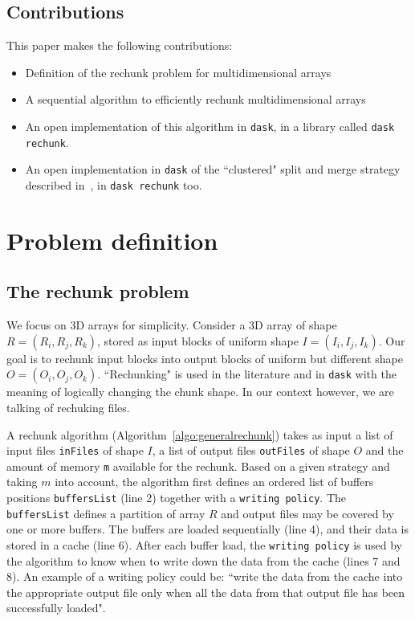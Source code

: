 \documentclass[conference]{IEEEtran}
\begin{document}
\subsection{Contributions}
This paper makes the following contributions:
\begin{itemize}
  \item Definition of the rechunk problem for multidimensional arrays
  \item A sequential algorithm to efficiently rechunk multidimensional arrays
  \item An open implementation of this algorithm in \texttt{dask},
  in a library called \texttt{dask rechunk}.
  \item An open implementation in \texttt{dask} of the ``clustered" split and
  merge strategy described in~\cite{seqalgorithms}, in \texttt{dask rechunk} too.
\end{itemize}

\section{Problem definition}
\subsection{The rechunk problem}
We focus on 3D arrays for simplicity. Consider a 3D array of shape $R =
(R_i, R_j, R_k)$, stored as input blocks of uniform shape $I =
(I_i, I_j, I_k)$. Our goal is to rechunk input blocks into output blocks of
uniform but different shape $O = (O_i, O_j, O_k)$. ``Rechunking" is used in
the literature and in \texttt{dask} with the meaning of logically changing the
chunk shape. In our context however, we are talking of rechuking files.

A rechunk algorithm (Algorithm~\ref{algo:generalrechunk}) takes as input a
list of input files \texttt{inFiles} of shape $I$, a list of output files
\texttt{outFiles} of shape $O$ and the amount of memory \texttt{m}
available for the rechunk. Based on a given strategy and taking $m$ into
account, the algorithm first defines an ordered list of buffers positions
\texttt{buffersList} (line 2) together with a \texttt{writing policy}. The
\texttt{buffersList} defines a partition of array $R$ and output files
may be covered by one or more buffers. The buffers are loaded sequentially
(line 4), and their data is stored in a cache (line 6). After each buffer load,
the \texttt{writing policy} is used by the algorithm to know when to write down
the data from the cache (lines 7 and 8). An example of a writing policy could be:
``write the data from the cache into the appropriate output file only when all
the data from that output file has been successfully loaded".
\end{document}
